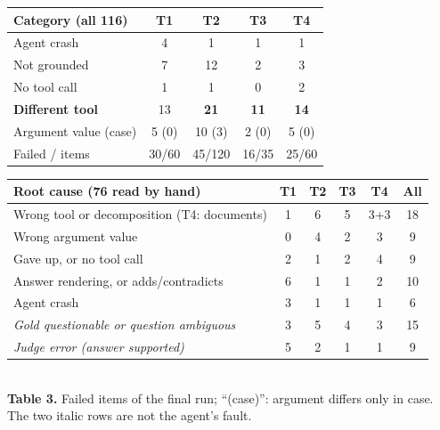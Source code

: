 \documentclass[10pt]{article}
\begin{document}
\begin{center}\footnotesize
\begin{minipage}[t]{0.42\textwidth}\vspace{0pt}\centering
\begin{tabular}{@{}lcccc@{}}
\toprule
Category (all 116) & T1 & T2 & T3 & T4 \\
\midrule
Agent crash & 4 & 1 & 1 & 1 \\
Not grounded & 7 & 12 & 2 & 3 \\
No tool call & 1 & 1 & 0 & 2 \\
\textbf{Different tool} & 13 & \textbf{21} & \textbf{11} & \textbf{14} \\
Argument value (case) & 5 (0) & 10 (3) & 2 (0) & 5 (0) \\
\midrule
Failed / items & 30/60 & 45/120 & 16/35 & 25/60 \\
\bottomrule
\end{tabular}
\end{minipage}\hfill
\begin{minipage}[t]{0.56\textwidth}\vspace{0pt}\centering
\begin{tabular}{@{}lccccc@{}}
\toprule
Root cause (76 read by hand) & T1 & T2 & T3 & T4 & All \\
\midrule
Wrong tool or decomposition (T4: documents) & 1 & 6 & 5 & 3+3 & 18 \\
Wrong argument value & 0 & 4 & 2 & 3 & 9 \\
Gave up, or no tool call & 2 & 1 & 2 & 4 & 9 \\
Answer rendering, or adds/contradicts & 6 & 1 & 1 & 2 & 10 \\
Agent crash & 3 & 1 & 1 & 1 & 6 \\
\midrule
\emph{Gold questionable or question ambiguous} & 3 & 5 & 4 & 3 & 15 \\
\emph{Judge error (answer supported)} & 5 & 2 & 1 & 1 & 9 \\
\bottomrule
\end{tabular}
\end{minipage}\\[0.2em]
{\footnotesize \textbf{Table 3.} Failed items of the final run; ``(case)'': argument differs only in case. The two italic rows are not the agent's fault.}
\end{center}
\end{document}
